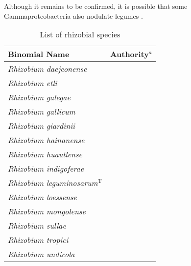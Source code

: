 \onehalfspacing


Although it remains to be confirmed, it is possible that some
Gammaproteobacteria also nodulate legumes \citep{Benhizia04}.


\singlespacing

  {\small
 \begin{longtable}{ll}

   \caption{List of rhizobial species} \\

    \toprule
    \textbf{Binomial Name} & \textbf{Authority}$^a$ \\
    \midrule
    \emph{Rhizobium daejeonense}                    & \citealp{Quan05}                      \\
    \emph{Rhizobium etli}                           & \citealp{Segovia93}                   \\
    \emph{Rhizobium galegae}                        & \citealp{Lindstrom89}                 \\
    \emph{Rhizobium gallicum}                       & \citealp{Amarger97}                   \\
    \emph{Rhizobium giardinii}                      & \citealp{Amarger97}                   \\
    \emph{Rhizobium hainanense}                     & \citealp{Chen97}                      \\
    \emph{Rhizobium huautlense}                     & \citealp{Wang98}                      \\
    \emph{Rhizobium indigoferae}                    & \citealp{Wei02}                       \\
    \emph{Rhizobium leguminosarum}$^{\mathrm{T}}$   & \citep{Frank79} \citealp{Frank89}     \\
    \emph{Rhizobium loessense}                      & \citealp{Wei03}                       \\
    \emph{Rhizobium mongolense}                     & \citealp{vanBerkum98}                 \\
    \emph{Rhizobium sullae}                         & \citealp{Squartini02}                 \\
    \emph{Rhizobium tropici}                        & \citealp{Martinez91}                  \\
    \emph{Rhizobium undicola}                       & \citep{deLajudie98a} \citealp{Young01a} \\

\end{longtable}}
